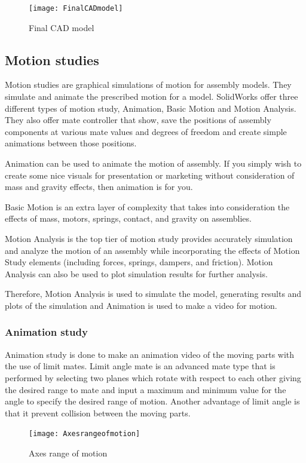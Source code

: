 \begin{figure}[h]
	\centering
	\texttt{[image: FinalCADmodel]}
    	\caption{Final CAD model}
\end{figure}

\newpage
\subsection{Motion studies}
Motion studies are graphical simulations of motion for assembly models. They simulate and animate the prescribed motion for a model. SolidWorks offer three different types of motion study, Animation, Basic Motion and Motion Analysis. They also offer mate controller that show, save the positions of assembly components at various mate values and degrees of freedom and create simple animations between those positions.

 Animation can be used to animate the motion of assembly. If you simply wish to create some nice visuals for presentation or marketing without consideration of mass and gravity effects, then animation is for you. 

 Basic Motion is an extra layer of complexity that takes into consideration the effects of mass, motors, springs, contact, and gravity on assemblies. 

 Motion Analysis is the top tier of motion study provides accurately simulation and analyze the motion of an assembly while incorporating the effects of Motion Study elements (including forces, springs, dampers, and friction). Motion Analysis can also be used to plot simulation results for further analysis.

 Therefore, Motion Analysis is used to simulate the model, generating results and plots of the simulation and Animation is used to make a video for motion.

\subsubsection{Animation study} 
 Animation study is done to make an animation video of the moving parts with the use of limit mates. Limit angle mate is an advanced mate type that is performed by selecting two planes which rotate with respect to each other giving the desired range to mate and input a maximum and minimum value for the angle to specify the desired range of motion. Another advantage of limit angle is that it prevent collision between the moving parts.
\begin{figure}[h]
	\centering
	\texttt{[image: Axesrangeofmotion]}
    	\caption{Axes range of motion}
\end{figure}

